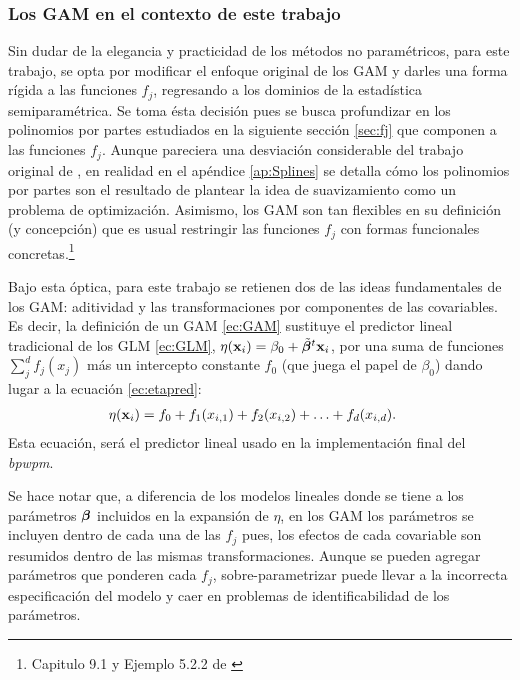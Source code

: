 \documentclass[../Main/Main.tex]{subfiles}
\begin{document}
\subsubsection*{Los GAM en el contexto de este trabajo}
Sin dudar de la elegancia y practicidad de los métodos no paramétricos, para este trabajo, se opta por modificar el enfoque original de los GAM y darles una forma rígida a las funciones $f_j$, regresando a los dominios de la estadística semiparamétrica. Se toma ésta decisión pues se busca profundizar en los polinomios por partes estudiados en la siguiente sección \ref{sec:fj} que componen a las funciones $f_j$. Aunque pareciera una desviación considerable del trabajo original de \citeauthor{hastie1990generalized}, en realidad en el apéndice \ref{ap:Splines} se detalla cómo los polinomios por partes son el resultado de plantear la idea de suavizamiento como un problema de optimización. Asimismo, los GAM son tan flexibles en su definición (y concepción) que es usual restringir las funciones $f_j$ con formas funcionales concretas.\footnote{Capitulo 9.1 y Ejemplo 5.2.2 de \citet{hastie2008elements}}

Bajo esta óptica, para este trabajo se retienen dos de las ideas fundamentales de los GAM: aditividad y las transformaciones por componentes de las covariables. Es decir, la definición de un GAM \eqref{ec:GAM} sustituye el predictor lineal tradicional de los GLM \eqref{ec:GLM}, $\eta(\mathbf{x}_i) = \beta_0 + \tilde{\bm{\beta}}^t\mathbf{x}_i$, por una suma de funciones $\sum_j^d f_j(x_j)$ más un intercepto constante $f_0$ (que juega el papel de $\beta_0$) dando lugar a la ecuación \eqref{ec:etapred}:
\begin{align}
\eta(\mathbf{x}_i) &= f_0 + f_1(x_{i,1}) + f_2(x_{i,2}) + \ldots + f_d(x_{i,d}). \label{ec:etapred}
\end{align}
Esta ecuación, será el predictor lineal usado en la implementación final del \textit{bpwpm}. 

Se hace notar que, a diferencia de los modelos lineales donde se tiene a los parámetros $\bm{\beta}$ incluidos en la expansión de $\eta$, en los GAM los parámetros se incluyen dentro de cada una de las $f_j$ pues, los efectos de cada covariable son resumidos dentro de las mismas transformaciones. Aunque se pueden agregar parámetros que ponderen cada $f_j$, sobre-parametrizar puede llevar a la incorrecta especificación del modelo y caer en problemas de identificabilidad de los parámetros.
\end{document}
